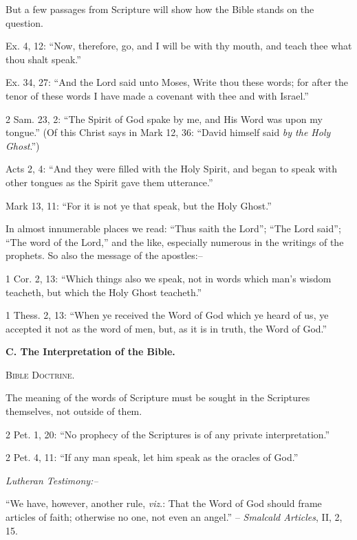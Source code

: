 \documentclass[
]{book}
\begin{document}
But a few passages from Scripture will show how the Bible stands on the question.

Ex. 4, 12: ``Now, therefore, go, and I will be with thy mouth, and teach thee what thou shalt speak.''

Ex. 34, 27: ``And the Lord said unto Moses, Write thou these words; for after the tenor of these words I have made a covenant with thee and with Israel.''

2 Sam. 23, 2: ``The Spirit of God spake by me, and His Word was upon my tongue.'' (Of this Christ says in Mark 12, 36: ``David himself said \emph{by the Holy Ghost}.'')

Acts 2, 4: ``And they were filled with the Holy Spirit, and began to speak with other tongues as the Spirit gave them utterance.''

Mark 13, 11: ``For it is not ye that speak, but the Holy Ghost.''

In almost innumerable places we read: ``Thus saith the Lord''; ``The Lord said''; ``The word of the Lord,'' and the like, especially numerous in the writings of the prophets. So also the message of the apostles:--

1 Cor. 2, 13: ``Which things also we speak, not in words which man's wisdom teacheth, but which the Holy Ghost teacheth.''

1 Thess. 2, 13: ``When ye received the Word of God which ye heard of us, ye accepted it not as the word of men, but, as it is in truth, the Word of God.''

\begin{center}
\textbf{C.  The Interpretation of the Bible.}

\textsc{Bible Doctrine.}
\end{center}

The meaning of the words of Scripture must be sought in the Scriptures themselves, not outside of them.

2 Pet. 1, 20: ``No prophecy of the Scriptures is of any private interpretation.''

2 Pet. 4, 11: ``If any man speak, let him speak as the oracles of God.''

\begin{center}
\textsl{Lutheran Testimony:--}
\end{center}

``We have, however, another rule, \emph{viz}.: That the Word of God should frame articles of faith; otherwise no one, not even an angel.'' -- \emph{Smalcald Articles}, II, 2, 15.
\end{document}
